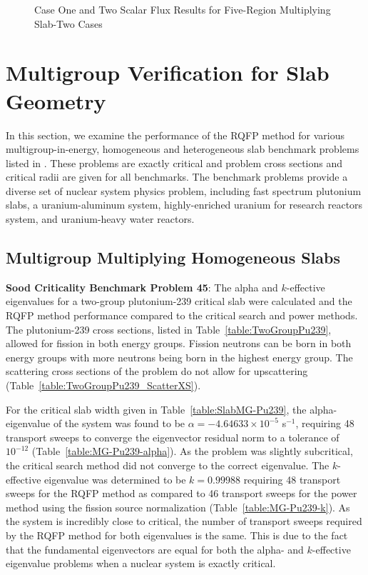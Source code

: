 \begin{figure}[!htbp]
	\centering
	\resizebox{0.75\textwidth}{!}{
	
	}
	\caption{Case One and Two Scalar Flux Results for Five-Region Multiplying Slab-Two Cases}
	\label{fig:FiveRegionMultiply}
\end{figure}

\clearpage

\section{Multigroup Verification for Slab Geometry}

In this section, we examine the performance of the RQFP method for various multigroup-in-energy, homogeneous and heterogeneous slab benchmark problems listed in \cite{sood2003analytical}. These problems are exactly critical and problem cross sections and critical radii are given for all benchmarks. The benchmark problems provide a diverse set of nuclear system physics problem, including fast spectrum plutonium slabs, a uranium-aluminum system, highly-enriched uranium for research reactors system, and uranium-heavy water reactors.

\subsection{Multigroup Multiplying Homogeneous Slabs}
\label{sec:MGMultSlabs}

\textbf{Sood Criticality Benchmark Problem 45}: The alpha and $k$-effective eigenvalues for a two-group plutonium-239 critical slab were calculated and the RQFP method performance compared to the critical search and power methods. The plutonium-239 cross sections, listed in Table~\ref{table:TwoGroupPu239}, allowed for fission in both energy groups. Fission neutrons can be born in both energy groups with more neutrons being born in the highest energy group. The scattering cross sections of the problem do not allow for upscattering (Table~\ref{table:TwoGroupPu239_ScatterXS}).

For the critical slab width given in Table~\ref{table:SlabMG-Pu239}, the alpha-eigenvalue of the system was found to be $\alpha = -4.64633 \times 10^{-5}$ s$^{-1}$, requiring 48 transport sweeps to converge the eigenvector residual norm to a tolerance of $10^{-12}$ (Table~\ref{table:MG-Pu239-alpha}). As the problem was slightly subcritical, the critical search method did not converge to the correct eigenvalue. The $k$-effective eigenvalue was determined to be $k=0.99988$ requiring 48 transport sweeps for the RQFP method as compared to 46 transport sweeps for the power method using the fission source normalization (Table~\ref{table:MG-Pu239-k}). As the system is incredibly close to critical, the number of transport sweeps required by the RQFP method for both eigenvalues is the same. This is due to the fact that the fundamental eigenvectors are equal for both the alpha- and $k$-effective eigenvalue problems when a nuclear system is exactly critical.

